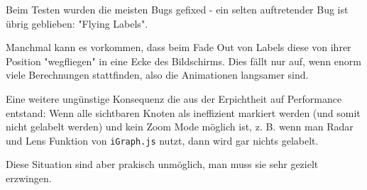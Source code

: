
Beim Testen wurden die meisten Bugs gefixed - ein selten auftretender Bug ist übrig geblieben:
"Flying Labels".

Manchmal kann es vorkommen, dass beim Fade Out von Labels diese von ihrer Position "wegfliegen" in eine Ecke des Bildschirms.
Dies fällt nur auf, wenn enorm viele Berechnungen stattfinden, also die Animationen langsamer sind.

Eine weitere ungünstige Konsequenz die aus der Erpichtheit auf Performance entstand:
Wenn alle sichtbaren Knoten als ineffizient markiert werden (und somit nicht gelabelt werden) und kein Zoom Mode möglich ist, z. B. wenn man Radar und Lens Funktion von \texttt{iGraph.js} nutzt,
dann wird gar nichts gelabelt.

Diese Situation sind aber prakisch unmöglich, man muss sie sehr gezielt erzwingen.